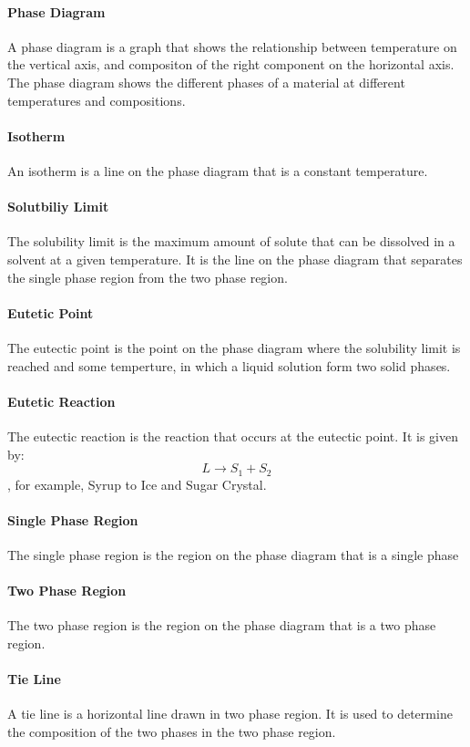 \documentclass[11pt]{report}
\begin{document}
\begin{Gibb's Energy}
\paragraph{Phase Diagram} A phase diagram is a graph that shows the relationship between temperature on the vertical axis, and compositon of the right component on the horizontal axis. The phase diagram shows the different phases of a material at different temperatures and compositions. 
\paragraph{Isotherm} An isotherm is a line on the phase diagram that is a constant temperature. 
\paragraph{Solutbiliy Limit} The solubility limit is the maximum amount of solute that can be dissolved in a solvent at a given temperature. It is the line on the phase diagram that separates the single phase region from the two phase region.
\paragraph{Eutetic Point} The eutectic point is the point on the phase diagram where the solubility limit is reached and some temperture, in which a liquid solution form two solid phases. 
\paragraph{Eutetic Reaction} The eutectic reaction is the reaction that occurs at the eutectic point. It is given by:
\begin{equation}
    L \rightarrow S_1 + S_2
\end{equation}
, for example, Syrup to Ice and Sugar Crystal.
\paragraph{Single Phase Region} The single phase region is the region on the phase diagram that is a single phase
\paragraph{Two Phase Region} The two phase region is the region on the phase diagram that is a two phase region. 
\paragraph{Tie Line} A tie line is a horizontal line drawn in two phase region. It is used to determine the composition of the two phases in the two phase region.

\end{Gibb's Energy}
\end{document}
